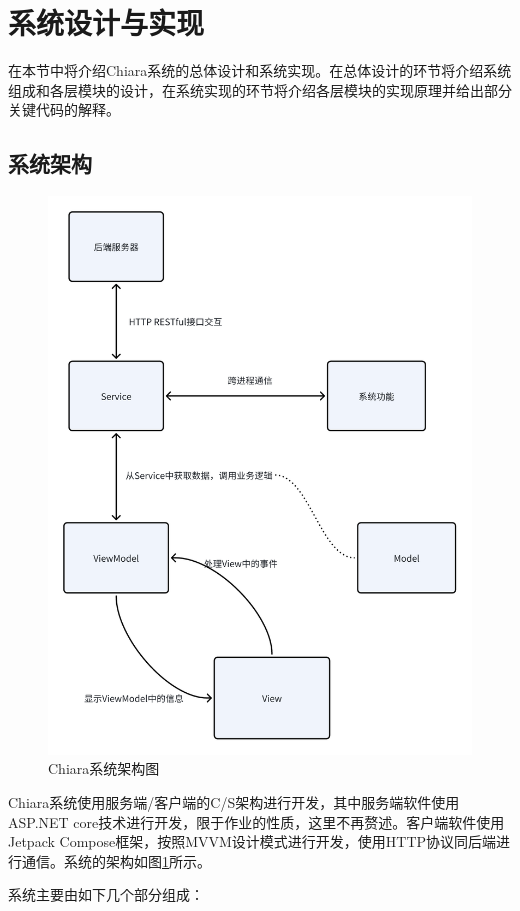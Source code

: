 \documentclass[main.tex]{subfiles}
\begin{document}
\section{系统设计与实现}


在本节中将介绍Chiara系统的总体设计和系统实现。在总体设计的环节将介绍系统组成和各层模块的设计，在系统实现的环节将介绍各层模块的实现原理并给出部分关键代码的解释。

\subsection{系统架构}

\begin{figure}[htbp]
    \centering
    \includegraphics[width=0.75\linewidth]{assets/system-architecture.png}
    \caption{Chiara系统架构图}
    \label{fig:system-architecture}
\end{figure}

Chiara系统使用服务端/客户端的C/S架构进行开发，其中服务端软件使用ASP.NET core技术进行开发，限于作业的性质，这里不再赘述。客户端软件使用Jetpack Compose框架，按照MVVM设计模式进行开发，使用HTTP协议同后端进行通信。系统的架构如图\ref{fig:system-architecture}所示。

系统主要由如下几个部分组成：
\end{document}
